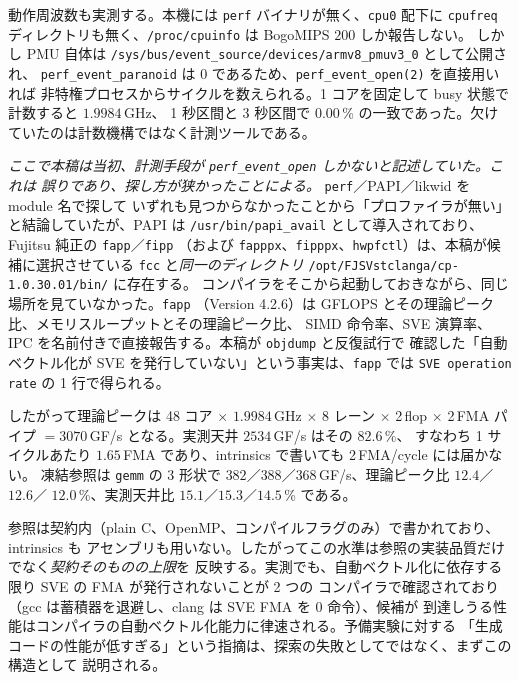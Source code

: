 \documentclass[conference,letterpaper]{IEEEtran}
\begin{document}
動作周波数も実測する。本機には \texttt{perf} バイナリが無く、\texttt{cpu0} 配下に
\texttt{cpufreq} ディレクトリも無く、\texttt{/proc/cpuinfo} は BogoMIPS $200$ しか報告しない。
しかし PMU 自体は \texttt{/sys/bus/event\_source/devices/armv8\_pmuv3\_0} として公開され、
\texttt{perf\_event\_paranoid} は $0$ であるため、\texttt{perf\_event\_open(2)} を直接用いれば
非特権プロセスからサイクルを数えられる。1 コアを固定して busy 状態で計数すると $1.9984$\,GHz、
1 秒区間と 3 秒区間で $0.00$\,\% の一致であった。欠けていたのは計数機構ではなく計測ツールである。

\emph{ここで本稿は当初、計測手段が \texttt{perf\_event\_open} しかないと記述していた。これは
誤りであり、探し方が狭かったことによる。} \texttt{perf}／PAPI／likwid を module 名で探して
いずれも見つからなかったことから「プロファイラが無い」と結論していたが、PAPI は
\texttt{/usr/bin/papi\_avail} として導入されており、Fujitsu 純正の \texttt{fapp}／\texttt{fipp}
（および \texttt{fapppx}、\texttt{fipppx}、\texttt{hwpfctl}）は、本稿が候補に選択させている
\texttt{fcc} と\emph{同一のディレクトリ} \texttt{/opt/FJSVstclanga/cp-1.0.30.01/bin/} に存在する。
コンパイラをそこから起動しておきながら、同じ場所を見ていなかった。\texttt{fapp}
（Version 4.2.6）は GFLOPS とその理論ピーク比、メモリスループットとその理論ピーク比、
SIMD 命令率、SVE 演算率、IPC を名前付きで直接報告する。本稿が \texttt{objdump} と反復試行で
確認した「自動ベクトル化が SVE を発行していない」という事実は、\texttt{fapp} では
\texttt{SVE operation rate} の 1 行で得られる。

したがって理論ピークは 48 コア $\times$ $1.9984$\,GHz $\times$ 8 レーン $\times$ 2\,flop
$\times$ 2\,FMA パイプ $=3070$\,GF/s となる。実測天井 $2534$\,GF/s はその $82.6$\,\%、
すなわち 1 サイクルあたり $1.65$\,FMA であり、intrinsics で書いても 2\,FMA/cycle には届かない。
凍結参照は \texttt{gemm} の 3 形状で $382$／$388$／$368$\,GF/s、理論ピーク比 $12.4$／$12.6$／
$12.0$\,\%、実測天井比 $15.1$／$15.3$／$14.5$\,\% である。

参照は契約内（plain C、OpenMP、コンパイルフラグのみ）で書かれており、intrinsics も
アセンブリも用いない。したがってこの水準は参照の実装品質だけでなく\emph{契約そのものの上限}を
反映する。実測でも、自動ベクトル化に依存する限り SVE の FMA が発行されないことが 2 つの
コンパイラで確認されており（gcc は蓄積器を退避し、clang は SVE FMA を 0 命令）、候補が
到達しうる性能はコンパイラの自動ベクトル化能力に律速される。予備実験に対する
「生成コードの性能が低すぎる」という指摘は、探索の失敗としてではなく、まずこの構造として
説明される。
\end{document}
